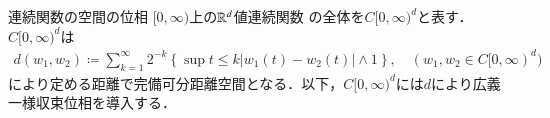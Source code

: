\begin{itembox}[l]{連続関数の空間の位相}
	$[0, \infty)$上の$\mathbb{R}^d$値連続関数	
	の全体を$C[0,\infty)^d$と表す．$C[0,\infty)^d$は
	\begin{align}
		d(w_1,w_2) \coloneqq \sum_{k=1}^{\infty}2^{-k}\left\{ \sup{t \leq k}{|w_1(t) - w_2(t)| \wedge 1} \right\}
		,\quad (w_1, w_2 \in C[0,\infty)^d)
	\end{align}
	により定める距離で完備可分距離空間となる．以下，$C[0,\infty)^d$には$d$により広義一様収束位相を導入する．
\end{itembox}

\begin{comment}
\begin{prf}完備性と可分性を示す．
	\begin{description}
		\item[完備性]
			$C[0,\infty)^d$から任意にCauchy列$(w_n)_{n=1}^{\infty}$を取る．任意の$\epsilon > 0$に対して
			或る$N \in \N$が取れて，$n,m > N$ならば$d(w_n,w_m) < \epsilon$が成り立つのであるから，距離関数の各項では
			$\sup{t \leq k}{|w_n(t) - w_m(t)|} < 2^k \epsilon\ (k=1,2,\cdots)$が成立している．
			$\epsilon$は任意であるから$(w_n)_{n=1}^{\infty}$は各点でCauchy列をなし，実数の完備性から
			各$t \in [0,\infty)$で$(w(t))_{n=1}^{\infty}$は$\R^d$で収束する．収束先を$w(t)\ (\forall t \in [0,\infty))$と
			表して極限関数$w$を定義すれば$w$は連続である．
			実際任意の$s \in [0, \infty)$に対し$s < k$となるように$k \in \N$を取れば，$t \leq k$の範囲で
			\begin{align}
				\sup{t \leq k}{|w_n(t) - w_m(t)|} \quad (n,m=1,2,\cdots)
			\end{align}
			がCauchy列をなしているから，任意の$\epsilon > 0$に対して或る$N \in \N$が存在し，$n,m > N$で
			\begin{align}
				\sup{t \leq k}{|w_n(t) - w_m(t)|} < \epsilon
			\end{align}
			となる．特に$w_m(t) \longrightarrow w(t)$であることを併せれば，各点$t \leq k$において
			$|w_n(t) - w(t)| \leq \epsilon$となるから
			\footnote{
				$\left| |w_n(t) - w(t)| - |w_n(t) - w_m(t)| \right| \leq |w_m(t) - w(t)|$で右辺をいくらでも小さくできるから，
				$|w_n(t) - w(t)| > \epsilon$であると矛盾する．
			}
			\begin{align}
				\sup{t \leq k}{|w_n(t) - w(t)|} \leq \epsilon
			\end{align}
			が成り立つ．連続関数列が一様収束しているから$w$は$s$で連続である．
			各点での連続性が示され，$w \in C[0,\infty)^d$であると判る．
		\item[可分性]

\end{comment}

